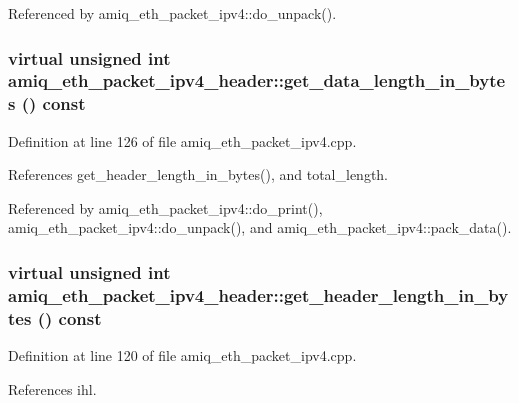 Referenced by amiq\_\-eth\_\-packet\_\-ipv4::do\_\-unpack().\hypertarget{classamiq__eth__packet__ipv4__header_a0af563bb75c1d671878c550927656a12}{
\subsubsection[{get\_\-data\_\-length\_\-in\_\-bytes}]{\setlength{\rightskip}{0pt plus 5cm}virtual unsigned int amiq\_\-eth\_\-packet\_\-ipv4\_\-header::get\_\-data\_\-length\_\-in\_\-bytes () const}}
\label{classamiq__eth__packet__ipv4__header_a0af563bb75c1d671878c550927656a12}


Definition at line 126 of file amiq\_\-eth\_\-packet\_\-ipv4.cpp.

References get\_\-header\_\-length\_\-in\_\-bytes(), and total\_\-length.

Referenced by amiq\_\-eth\_\-packet\_\-ipv4::do\_\-print(), amiq\_\-eth\_\-packet\_\-ipv4::do\_\-unpack(), and amiq\_\-eth\_\-packet\_\-ipv4::pack\_\-data().\hypertarget{classamiq__eth__packet__ipv4__header_acfb6bc2bf22a9465b410bce2c9ad48bc}{
\subsubsection[{get\_\-header\_\-length\_\-in\_\-bytes}]{\setlength{\rightskip}{0pt plus 5cm}virtual unsigned int amiq\_\-eth\_\-packet\_\-ipv4\_\-header::get\_\-header\_\-length\_\-in\_\-bytes () const}}
\label{classamiq__eth__packet__ipv4__header_acfb6bc2bf22a9465b410bce2c9ad48bc}


Definition at line 120 of file amiq\_\-eth\_\-packet\_\-ipv4.cpp.

References ihl.

